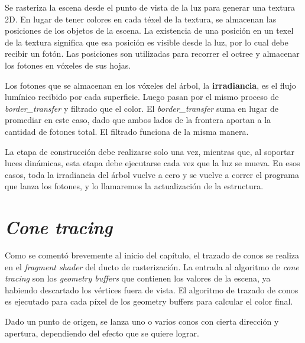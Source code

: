 Se rasteriza la escena desde el punto de vista de la luz para generar una textura 2D.
En lugar de tener colores en cada téxel de la textura, se almacenan las posiciones de los objetos de la escena.
La existencia de una posición en un texel de la textura significa que esa posición es visible desde la luz, por lo cual debe recibir un fotón.
Las posiciones son utilizadas para recorrer el octree y almacenar los fotones en vóxeles de sus hojas.

Los fotones que se almacenan en los vóxeles del árbol, la \textbf{irradiancia}, es el flujo lumínico recibido por cada superficie.
Luego pasan por el mismo proceso de \textit{border\_transfer} y filtrado que el color.
El \textit{border\_transfer} suma en lugar de promediar en este caso, dado que ambos lados de la frontera aportan a la cantidad de fotones total.
El filtrado funciona de la misma manera.

La etapa de construcción debe realizarse solo una vez, mientras que, al soportar luces dinámicas, esta etapa debe ejecutarse cada vez que la luz se mueva.
En esos casos, toda la irradiancia del árbol vuelve a cero y se vuelve a correr el programa que lanza los fotones, y lo llamaremos la actualización de la estructura.


\section{\textit{Cone tracing}}\label{sec:cone_tracing}

Como se comentó brevemente al inicio del capítulo, el trazado de conos se realiza en el \textit{fragment shader} del ducto de rasterización.
La entrada al algoritmo de \textit{cone tracing} son los \textit{geometry buffers} que contienen los valores de la escena, ya habiendo descartado los vértices fuera de vista.
El algoritmo de trazado de conos es ejecutado para cada píxel de los geometry buffers para calcular el color final.

Dado un punto de origen, se lanza uno o varios conos con cierta dirección y apertura, dependiendo del efecto que se quiere lograr.

